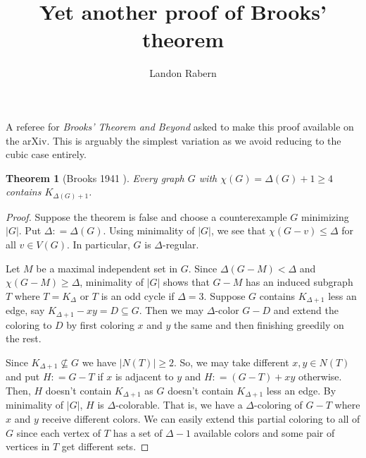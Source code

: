 \documentclass[12pt]{amsart}
\title{Yet another proof of Brooks' theorem}
\author{Landon Rabern}
\theoremstyle{plain}
\newtheorem{thm}{Theorem}
\theoremstyle{definition}
\theoremstyle{remark}
\newcommand{\card}[1]{\left|#1\right|}
\newcommand{\DefinedAs}{\mathrel{\mathop:}=}
\begin{document}
\maketitle

A referee for \emph{Brooks' Theorem and Beyond} \cite{cranston2014brooks} asked to make this proof available on the arXiv.  This is arguably the simplest variation as we avoid reducing to the cubic case entirely.

\begin{thm}[Brooks 1941 \cite{brooks1941colouring}]
Every graph $G$ with $\chi(G) = \Delta(G) + 1 \ge 4$ contains $K_{\Delta(G) + 1}$.
\end{thm}
\begin{proof}
Suppose the theorem is false and choose a counterexample $G$ minimizing
$\card{G}$.  Put $\Delta \DefinedAs \Delta(G)$. Using minimality of $\card{G}$,
we see that $\chi(G - v) \le \Delta$ for all $v \in
V(G)$. In particular, $G$ is $\Delta$-regular.

Let $M$ be a maximal independent set in $G$.  Since $\Delta(G-M) < \Delta$ and $\chi(G-M) \ge \Delta$, minimality of $|G|$ shows that $G-M$ has an induced subgraph $T$ where $T = K_\Delta$ or $T$ is an odd cycle if $\Delta=3$.   Suppose $G$ contains $K_{\Delta + 1}$ less an edge, say $K_{\Delta + 1} - xy = D \subseteq G$. Then we may $\Delta$-color $G-D$ and extend the coloring to $D$ by first coloring $x$ and $y$ the same and then finishing greedily on the rest.

Since $K_{\Delta + 1} \not \subseteq G$ we have $\card{N(T)} \ge 2$. So, we may take different $x, y \in N(T)$ and put $H \DefinedAs G - T$ if $x$ is adjacent to $y$ and $H \DefinedAs (G-T) + xy$ otherwise.  Then, $H$ doesn't contain $K_{\Delta + 1}$ as $G$ doesn't contain $K_{\Delta + 1}$ less an edge. By minimality of $\card{G}$, $H$ is $\Delta$-colorable. That is, we have a $\Delta$-coloring of $G - T$ where $x$ and $y$ receive different colors.  We can easily extend this partial coloring to all of $G$ since each vertex of $T$ has a set of $\Delta - 1$ available
colors and some pair of vertices in $T$ get different sets.  
\end{proof}



\end{document}

